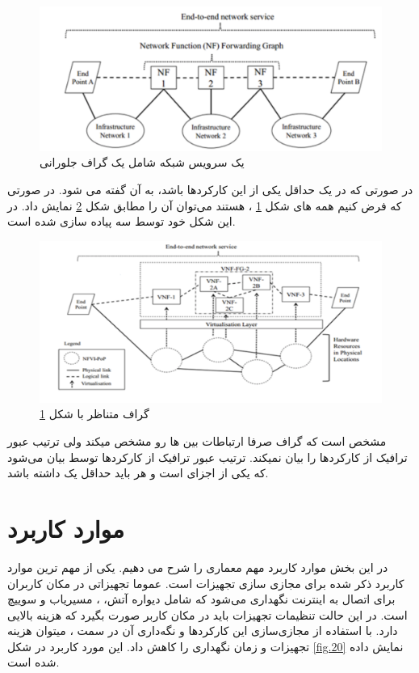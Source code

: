 \begin{figure}[h!]
\center\includegraphics[scale=.5]{images/network-service}
\caption{یک سرویس شبکه شامل یک گراف جلورانی}
\label{fig.18}
\end{figure}

در صورتی که در یک   حداقل یکی از این کارکردها  باشد، به آن  گفته می شود.
در صورتی که فرض کنیم همه  های شکل
\ref{fig.18}
،  هستند می‌توان آن را مطابق شکل
\ref{fig.19}
نمایش داد.
در این شکل  خود توسط سه  پیاده سازی شده است.

\begin{figure}[h!]
\center\includegraphics[scale=.5]{images/vnf-fg}
\caption{گراف  متناظر با شکل \ref{fig.18}}
\label{fig.19}
\end{figure}

مشخص است که گراف  صرفا ارتباطات بین ‌ها رو مشخص میکند ولی ترتیب عبور ترافیک از کارکردها را بیان نمیکند.
ترتیب عبور ترافیک از کارکردها توسط  بیان می‌شود که یکی از اجزای  است و هر  باید حداقل یک  داشته باشد.

\section{موارد کاربرد}
در این بخش موارد کاربرد مهم معماری  را شرح می دهیم.
یکی از مهم ترین موارد کاربرد ذکر شده برای  مجازی سازی تجهیزات  است.
عموما تجهیزاتی در مکان کاربران برای اتصال به اینترنت نگهداری می‌شود که شامل دیواره آتش، ، مسیریاب و سوییچ است.
در این حالت تنظیمات تجهیزات باید در مکان کاربر صورت بگیرد که هزینه بالایی دارد.
با استفاده از مجازی‌سازی این کارکردها و نگه‌داری آن در سمت ، میتوان هزینه تجهیزات و زمان نگهداری را کاهش داد.
این مورد کاربرد در شکل \ref{fig.20} نمایش داده شده است.

